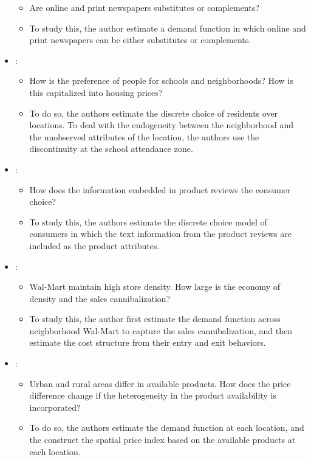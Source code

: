 \documentclass[]{book}
\providecommand{\tightlist}{%
  \setlength{\itemsep}{0pt}\setlength{\parskip}{0pt}}
\begin{document}
\begin{itemize}
  \begin{itemize}
  \tightlist
  \item
    Are online and print newspapers substitutes or complements?
  \item
    To study this, the author estimate a demand function in which online
    and print newspapers can be either substitutes or complements.
  \end{itemize}
\item
  \citet{Bayer2007}:

  \begin{itemize}
  \tightlist
  \item
    How is the preference of people for schools and neighborhoods? How
    is this capitalized into housing prices?
  \item
    To do so, the authors estimate the discrete choice of residents over
    locations. To deal with the endogeneity between the neighborhood and
    the unobserved attributes of the location, the authors use the
    discontinuity at the school attendance zone.
  \end{itemize}
\item
  \citet{Archak2011}:

  \begin{itemize}
  \tightlist
  \item
    How does the information embedded in product reviews the consumer
    choice?
  \item
    To study this, the authors estimate the discrete choice model of
    consumers in which the text information from the product reviews are
    included as the product attributes.
  \end{itemize}
\item
  \citet{Holmes2011}:

  \begin{itemize}
  \tightlist
  \item
    Wal-Mart maintain high store density. How large is the economy of
    density and the sales cannibalization?
  \item
    To study this, the author first estimate the demand function across
    neighborhood Wal-Mart to capture the sales cannibalization, and then
    estimate the cost structure from their entry and exit behaviors.
  \end{itemize}
\item
  \citet{Handbury2014}:

  \begin{itemize}
  \tightlist
  \item
    Urban and rural areas differ in available products. How does the
    price difference change if the heterogeneity in the product
    availability is incorporated?
  \item
    To do so, the authors estimate the demand function at each location,
    and the construct the spatial price index based on the available
    products at each location.
  \end{itemize}
\end{itemize}
\end{document}
